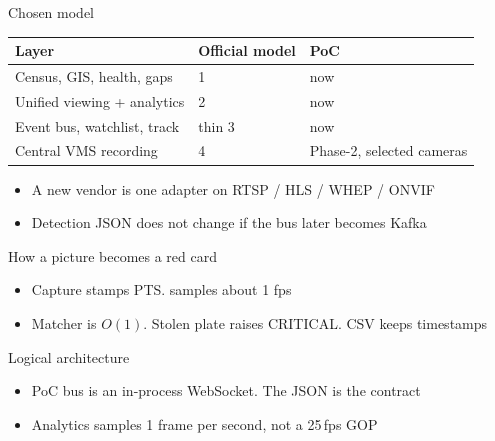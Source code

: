 \documentclass[aspectratio=169,11pt]{beamer}
\begin{document}
\begin{frame}{Chosen model}
\begin{center}
\begin{tabular}{@{}lll@{}}
\toprule
Layer & Official model & PoC \\
\midrule
Census, GIS, health, gaps & 1 & now \\
Unified viewing + analytics & 2 & now \\
Event bus, watchlist, track & thin 3 & now \\
Central VMS recording & 4 & Phase-2, selected cameras \\
\bottomrule
\end{tabular}
\end{center}
\medskip
\begin{itemize}\itemsep0.55em
\item A new vendor is one adapter on RTSP / HLS / WHEP / ONVIF
\item Detection JSON does not change if the bus later becomes Kafka
\end{itemize}
\end{frame}

\begin{frame}{How a picture becomes a red card}
\begin{center}\resizebox{0.96\textwidth}{!}{}\end{center}
\medskip
\begin{itemize}\itemsep0.45em
\item Capture stamps PTS.  samples about 1 fps
\item Matcher is $O(1)$. Stolen plate raises CRITICAL. CSV keeps timestamps
\end{itemize}
\end{frame}

\begin{frame}{Logical architecture}
\begin{center}\resizebox{0.96\textwidth}{!}{}\end{center}
\medskip
\begin{itemize}\itemsep0.5em
\item PoC bus is an in-process WebSocket. The JSON is the contract
\item Analytics samples 1 frame per second, not a 25\,fps GOP
\end{itemize}
\end{frame}
\end{document}
